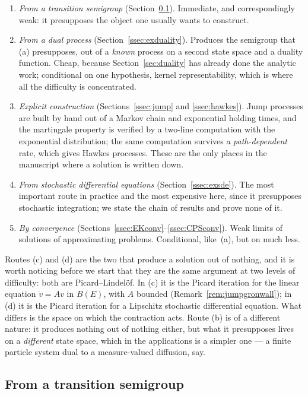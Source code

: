 \documentclass[11pt,a4paper]{article}
\theoremstyle{plain}
\theoremstyle{definition}
\theoremstyle{remark}
\newcommand{\Bdd}{B}                           %
\begin{document}
\begin{enumerate}[label=(\alph*)]
\item \emph{From a transition semigroup} (Section~\ref{ssec:exsemigroup}).
  Immediate, and correspondingly weak: it presupposes the object one usually
  wants to construct.
\item \emph{From a dual process} (Section~\ref{ssec:exduality}).  Produces the
  semigroup that (a) presupposes, out of a \emph{known} process on a second state
  space and a duality function.  Cheap, because Section~\ref{sec:duality} has
  already done the analytic work; conditional on one hypothesis, kernel
  representability, which is where all the difficulty is concentrated.
\item \emph{Explicit construction} (Sections~\ref{ssec:jump} and
  \ref{ssec:hawkes}).  Jump processes are built by hand out of a Markov chain and
  exponential holding times, and the martingale property is verified by a two-line
  computation with the exponential distribution; the same computation survives a
  \emph{path-dependent} rate, which gives Hawkes processes.  These are the only
  places in the manuscript where a solution is written down.
\item \emph{From stochastic differential equations}
  (Section~\ref{ssec:exsde}).  The most important route in practice and the most
  expensive here, since it presupposes stochastic integration; we state the chain
  of results and prove none of it.
\item \emph{By convergence} (Sections~\ref{ssec:EKconv}--\ref{ssec:CPSconv}).
  Weak limits of solutions of approximating problems.  Conditional, like~(a), but
  on much less.
\end{enumerate}

Routes (c) and (d) are the two that produce a solution out of nothing, and it is
worth noticing before we start that they are the same argument at two levels of
difficulty: both are Picard--Lindel\"of.  In (c) it is the Picard iteration for
the linear equation $\dot v = Av$ in $\Bdd(E)$, with $A$ bounded
(Remark~\ref{rem:jumpgronwall}); in (d) it is the Picard iteration for a
Lipschitz stochastic differential equation.  What differs is the space on which
the contraction acts.  Route (b) is of a different nature: it produces nothing
out of nothing either, but what it presupposes lives on a \emph{different} state
space, which in the applications is a simpler one --- a finite particle system
dual to a measure-valued diffusion, say.

\subsection{From a transition semigroup}
\label{ssec:exsemigroup}
\end{document}

